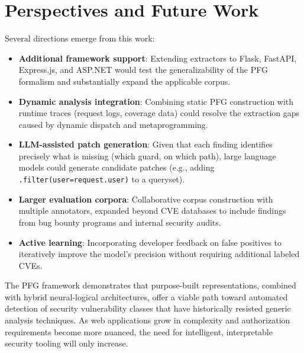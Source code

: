 \section*{Perspectives and Future Work}

Several directions emerge from this work:

\begin{itemize}
    \item \textbf{Additional framework support}: Extending extractors to Flask, FastAPI, Express.js, and ASP.NET would test the generalizability of the PFG formalism and substantially expand the applicable corpus.

    \item \textbf{Dynamic analysis integration}: Combining static PFG construction with runtime traces (request logs, coverage data) could resolve the extraction gaps caused by dynamic dispatch and metaprogramming.

    \item \textbf{LLM-assisted patch generation}: Given that each finding identifies precisely what is missing (which guard, on which path), large language models could generate candidate patches (e.g., adding \texttt{.filter(user=request.user)} to a queryset).

    \item \textbf{Larger evaluation corpora}: Collaborative corpus construction with multiple annotators, expanded beyond CVE databases to include findings from bug bounty programs and internal security audits.

    \item \textbf{Active learning}: Incorporating developer feedback on false positives to iteratively improve the model's precision without requiring additional labeled CVEs.
\end{itemize}

The PFG framework demonstrates that purpose-built representations, combined with hybrid neural-logical architectures, offer a viable path toward automated detection of security vulnerability classes that have historically resisted generic analysis techniques. As web applications grow in complexity and authorization requirements become more nuanced, the need for intelligent, interpretable security tooling will only increase.